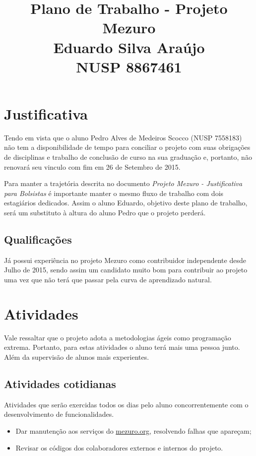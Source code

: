 \documentclass[12pt]{article}
\begin{document}
  \title{Plano de Trabalho - Projeto Mezuro\\
         Eduardo Silva Araújo\\
         NUSP 8867461}

  \maketitle

  \section{Justificativa}
  Tendo em vista que o aluno Pedro Alves de Medeiros Scocco (NUSP 7558183) não tem a disponibilidade de tempo para conciliar o projeto com suas obrigações de disciplinas e trabalho de conclusão de curso na sua graduação e, portanto, não renovará seu vinculo com fim em 26 de Setembro de 2015.

  Para manter a trajetória descrita no documento \textit{Projeto Mezuro - Justificativa para Bolsistas} é importante manter o mesmo fluxo de trabalho com dois estagiários dedicados. Assim o aluno Eduardo, objetivo deste plano de trabalho, será um substituto à altura do aluno Pedro que o projeto perderá.

    \subsection{Qualificações}
    Já possui experiência no projeto Mezuro como contribuidor independente desde Julho de 2015, sendo assim um candidato muito bom para contribuir ao projeto uma vez que não terá que passar pela curva de aprendizado natural.

  \section{Atividades}
    Vale ressaltar que o projeto adota a metodologias ágeis como programação extrema. Portanto, para estas atividades o aluno terá mais uma pessoa junto. Além da supervisão de alunos mais experientes.

    \subsection{Atividades cotidianas}
      Atividades que serão exercidas todos os dias pelo aluno concorrentemente com o desenvolvimento de funcionalidades.

      \begin{itemize}
        \item Dar manutenção aos serviços do \url{mezuro.org}, resolvendo falhas que apareçam;
        \item Revisar os códigos dos colaboradores externos e internos do projeto.
      \end{itemize}
\end{document}

